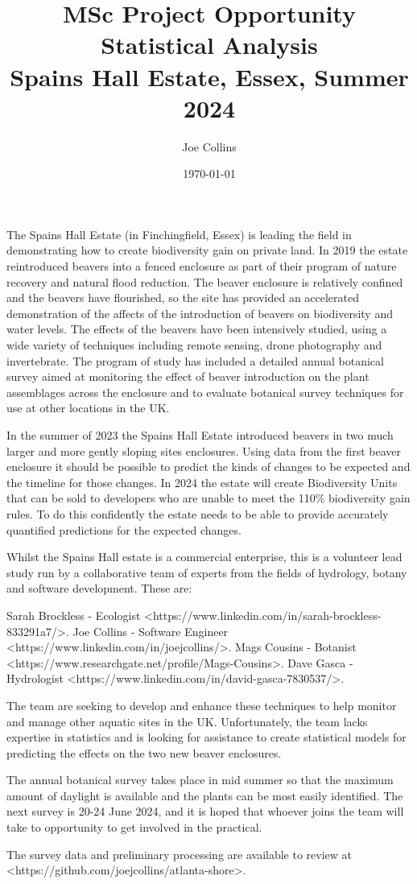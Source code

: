 \documentclass[10pt]{article}
\title{MSc Project Opportunity\\ Statistical Analysis \\
  \Large Spains Hall Estate, Essex, Summer 2024}
\author{Joe Collins}
\date{\today}
\begin{document}
\maketitle

The Spains Hall Estate
(in Finchingfield, Essex)
is leading the field in demonstrating
how to create biodiversity gain on private land.
In 2019 the estate reintroduced beavers into a fenced enclosure
as part of their program of nature recovery and natural flood reduction.
The beaver enclosure is relatively confined
and the beavers have flourished,
so the site has provided an accelerated demonstration of the affects of the introduction of beavers
on biodiversity and water levels.
The effects of the beavers have been intensively studied,
using a wide variety of techniques including remote sensing, drone photography and invertebrate.
The program of study has included a detailed annual botanical survey
aimed at monitoring the effect of beaver introduction on the plant assemblages across the enclosure
and to evaluate botanical survey techniques for use at other locations in the UK.

In the summer of 2023 the Spains Hall Estate
introduced beavers in two much larger and more gently sloping sites enclosures.
Using data from the first beaver enclosure
it should be possible to predict the kinds of changes to be expected and the timeline for those changes.
In 2024 the estate will create Biodiversity Units that can be sold to developers 
who are unable to meet the 110\% biodiversity gain rules.
To do this confidently the estate needs to be able to 
provide accurately quantified predictions for the expected changes.

Whilst the Spains Hall estate is a commercial enterprise,
this is a volunteer lead study
run by a collaborative team of experts from the fields of hydrology, botany and software development.
These are:

Sarah Brockless - Ecologist <https://www.linkedin.com/in/sarah-brockless-833291a7/>.
Joe Collins - Software Engineer <https://www.linkedin.com/in/joejcollins/>.
Mags Cousins - Botanist <https://www.researchgate.net/profile/Mags-Cousins>.
Dave Gasca - Hydrologist <https://www.linkedin.com/in/david-gasca-7830537/>.

The team are seeking to develop and enhance these techniques
to help monitor and manage other aquatic sites in the UK.
Unfortunately, the team lacks expertise in statistics
and is looking for assistance to create statistical models for predicting the effects
on the two new beaver enclosures.

The annual botanical survey takes place in mid summer
so that the maximum amount of daylight is available
and the plants can be most easily identified.
The next survey is 20-24 June 2024,
and it is hoped that whoever joins the team
will take to opportunity to get involved in the practical.

The survey data and preliminary processing are available
to review at <https://github.com/joejcollins/atlanta-shore>.
\end{document}
